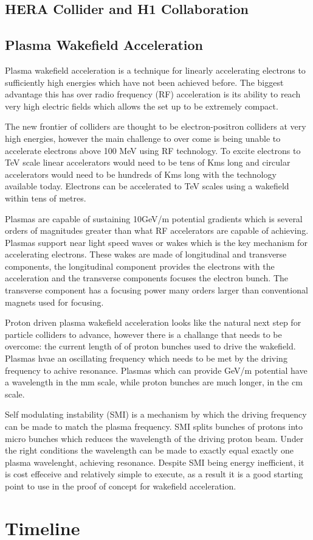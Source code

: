 \documentclass[journal, a4paper,12pt]{IEEEtran}
\begin{document}
\subsection{HERA Collider and H1 Collaboration}





\subsection{Plasma Wakefield Acceleration}

Plasma wakefield acceleration is a technique for linearly accelerating electrons to sufficiently high energies which have not been achieved before. The biggest advantage this has over radio frequency (RF) acceleration is its ability to reach very high electric fields which allows the set up to be extremely compact. 

The new frontier of colliders are thought to be electron-positron colliders at very high energies, however the main challenge to over come is being unable to accelerate electrons above 100 MeV using RF technology. To excite electrons to TeV scale linear accelerators would need to be tens of Kms long and circular accelerators would need to be hundreds of Kms long with the technology available today. Electrons can be accelerated to TeV scales using a wakefield within tens of metres.

Plasmas are capable of sustaining 10GeV/m potential gradients which is several orders of magnitudes greater than what RF accelerators are capable of achieving. Plasmas support near light speed waves or wakes which is the key mechanism for accelerating electrons. These wakes are made of longitudinal and transverse components, the longitudinal component provides the electrons with the acceleration and the transverse components focuses the electron bunch. The transverse component has a focusing power many orders larger than conventional magnets used for focusing.

Proton driven plasma wakefield acceleration looks like the natural next step for particle colliders to advance, however there is a challange that needs to be overcome: the current length of of proton bunches used to drive the wakefield. Plasmas hvae an oscillating frequency which needs to be met by the driving frequency to achive resonance. Plasmas which can provide GeV/m potential have a wavelength in the mm scale, while proton bunches are much longer, in the cm scale.

Self modulating instability (SMI) is a mechanism by which the driving frequency can be made to match the plasma frequency. SMI splits bunches of protons into micro bunches which reduces the wavelength of the driving proton beam. Under the right conditions the wavelength can be made to exactly equal exactly one plasma wavelenght, achieving resonance. Despite SMI being energy inefficient, it is cost effeceive and relatively simple to execute, as a result it is a good starting point to use in the proof of concept for wakefield acceleration.





\section{Timeline}
\end{document}

